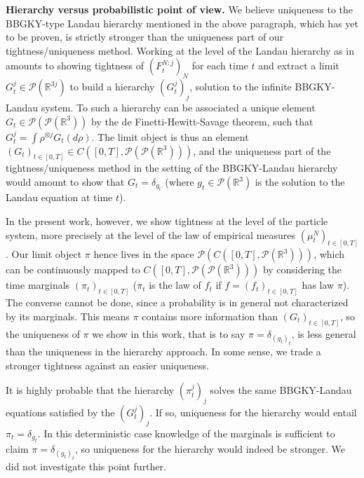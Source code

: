 \documentclass[11pt,a4paper]{article}
\theoremstyle{definition}
\theoremstyle{plain}
\begin{document}
\textbf{Hierarchy versus probabilistic point of view.}
We believe uniqueness to the BBGKY-type Landau hierarchy mentioned in the above paragraph, which has yet to be proven, is strictly stronger than the uniqueness part of our tightness/uniqueness method. Working at the level of the Landau hierarchy as in \cite{CarrilloGuo2025, MiotPulvirentiSaffirio2011} amounts to showing tightness of $(F^{N:j}_t)_N$ for each time $t$ and extract a limit $G^j_t \in \mathcal{P}(\mathbb{R}^{3j})$ to build a hierarchy $(G^j_t)_j$, solution to the infinite BBGKY-Landau system. To such a hierarchy can be associated a unique element $G_t\in\mathcal{P}(\mathcal{P}(\mathbb{R}^{3}))$ by the de Finetti-Hewitt-Savage theorem, such that
$G^j_t = \int \rho^{\otimes j} G_t(d\rho)$. The limit object is thus an element $(G_t)_{t\in[0,T]}\in C\left([0,T],\mathcal{P}(\mathcal{P}(\mathbb{R}^{3}))\right)$, and the uniqueness part of the tightness/uniqueness method in the setting of the BBGKY-Landau hierarchy would amount to show that $G_t=\delta_{g_t}$ (where $g_t\in\mathcal{P}(\mathbb{R}^3)$ is the solution to the Landau equation at time $t$).

In the present work, however, we show tightness at the level of the particle system, more precisely at the level of the law of empirical measures $(\mu^N_t)_{t\in[0,T]}$. Our limit object $\pi$ hence lives in the space $\mathcal{P}\left(C([0,T],\mathcal{P}(\mathbb{R}^3))\right)$, which can be continuously mapped to $C\left([0,T],\mathcal{P}(\mathcal{P}(\mathbb{R}^{3}))\right)$ by considering the time marginals $(\pi_t)_{t\in [0,T]}$ ($\pi_t$ is the law of $f_t$ if $f=(f_t)_{t\in [0,T]}$ has law $\pi$). The converse cannot be done, since a probability is in general not characterized by its marginals. This means $\pi$ contains more information than $(G_t)_{t\in[0,T]}$, so the uniqueness of $\pi$ we show in this work, that is to say $\pi=\delta_{(g_t)_t}$, is less general than the uniqueness in the hierarchy approach. In some sense, we trade a stronger tightness against an easier uniqueness. 

It is highly probable that the hierarchy $(\pi^j_t)_j$ solves the same BBGKY-Landau equations satisfied by the $(G^j_t)_j$. If so, uniqueness for the hierarchy would entail $\pi_t=\delta_{g_t}$. In this deterministic case knowledge of the marginals is sufficient to claim $\pi=\delta_{(g_t)_t}$, so uniqueness for the hierarchy would indeed be stronger. We did not investigate this point further.
\\
\end{document}
